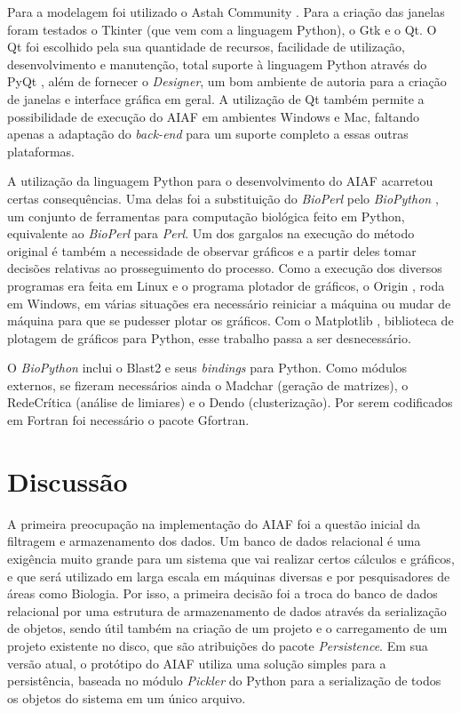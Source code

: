 Para a modelagem foi utilizado o Astah Community \cite{astah}. Para a criação das janelas foram testados o Tkinter (que vem com a linguagem Python), o Gtk
e o Qt. O Qt foi escolhido pela sua quantidade de recursos, facilidade de utilização, desenvolvimento e manutenção, total suporte à linguagem Python através
do PyQt \cite{pyqt}, além de fornecer o \textit{Designer}, um bom ambiente de autoria para a criação de janelas e interface gráfica em geral.
A utilização de Qt também permite a possibilidade de execução do AIAF em ambientes Windows e Mac,
faltando apenas a adaptação do \textit{back-end} para um suporte completo a essas outras plataformas.

A utilização da linguagem Python para o desenvolvimento do AIAF acarretou certas consequências. Uma delas foi a substituição do \textit{BioPerl} pelo
\textit{BioPython} \cite{biopython}, um conjunto de ferramentas para computação biológica feito em Python, equivalente ao \textit{BioPerl} para \textit{Perl}.
Um dos gargalos na execução do método original é também a necessidade de observar gráficos e a partir deles tomar decisões relativas ao prosseguimento do
processo. Como a execução dos diversos programas era feita em Linux e o programa plotador de gráficos, o Origin \cite{origin}, roda em Windows, em várias
situações era necessário reiniciar a máquina ou mudar de máquina para que se pudesser plotar os gráficos. Com o Matplotlib \cite{matplotlib}, biblioteca de 
plotagem de gráficos para Python, esse trabalho passa a ser desnecessário.

O \textit{BioPython} inclui o Blast2 e seus \textit{bindings} para Python. Como módulos externos, se fizeram necessários ainda o Madchar (geração de matrizes),
o RedeCrítica (análise de limiares) e o Dendo (clusterização). Por serem codificados em Fortran foi necessário o pacote Gfortran.

\section{Discussão} \label{sec:discussao}

A primeira preocupação na implementação do AIAF foi a questão inicial da filtragem e armazenamento dos dados. Um banco de dados relacional é uma exigência
muito grande para um sistema que vai realizar certos cálculos e gráficos, e que será utilizado em larga escala em máquinas diversas e por pesquisadores de
áreas como Biologia. Por isso, a primeira decisão foi a troca do banco de dados relacional por uma estrutura de armazenamento de dados através da serialização
de objetos, sendo útil também na criação de um projeto e o carregamento de um projeto existente no disco, que são atribuições do pacote 
\textit{Persistence}. Em sua versão atual, o protótipo do AIAF utiliza uma solução simples para a persistência, baseada no módulo \textit{Pickler} do
Python para a serialização de todos os objetos do sistema em um único arquivo.


